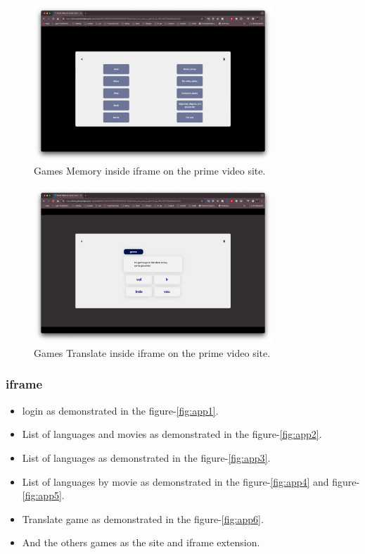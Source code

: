 \documentclass[12pt]{article}
\begin{document}
    \begin{figure}[!h]
      \centering
      \caption{
      Games Memory inside iframe on the prime video site.
      }
      \label{fig:iframe3}
      \includegraphics[width=0.8\textwidth]{assets/11.png}
    \end{figure}

    \begin{figure}[!h]
      \centering
      \caption{
      Games Translate inside iframe on the prime video site.
      }
      \label{fig:iframe4}
      \includegraphics[width=0.8\textwidth]{assets/12.png}
    \end{figure}

\subsubsection{iframe}
\begin{itemize}
  \item login as demonstrated in the figure-\ref{fig:app1}.
  \item List of languages and movies as demonstrated in the figure-\ref{fig:app2}.
  \item List of languages as demonstrated in the figure-\ref{fig:app3}.
  \item List of languages by movie as demonstrated in the figure-\ref{fig:app4} and figure-\ref{fig:app5}.
  \item Translate game as demonstrated in the figure-\ref{fig:app6}.
  \item And the others games as the site and iframe extension. 
  \end{itemize}
\end{document}
